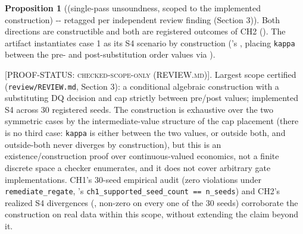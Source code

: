 \documentclass[11pt,a4paper]{article}
\theoremstyle{definition}
\newtheorem{proposition}{Proposition}
\newcommand{\proofstatus}[1]{[\textsc{PROOF-STATUS}: \textsc{#1}]}
\begin{document}
\begin{proposition}[(single-pass unsoundness, scoped to the implemented construction) -{}- retagged per independent review finding (Section 3)]
Both directions are constructible and both are registered outcomes of CH2 (). The artifact instantiates case 1 as its S4 scenario by construction ('s , placing \texttt{kappa} between the pre- and post-substitution order values via ).

\proofstatus{checked-scope-only (REVIEW.md)}. Largest scope certified (\texttt{review/REVIEW.md}, Section 3): a conditional algebraic construction with a substituting DQ decision and cap strictly between pre/post values; implemented S4 across 30 registered seeds. The construction is exhaustive over the two symmetric cases by the intermediate-value structure of the cap placement (there is no third case: \texttt{kappa} is either between the two values, or outside both, and outside-both never diverges by construction), but this is an existence/construction proof over continuous-valued economics, not a finite discrete space a checker enumerates, and it does not cover arbitrary gate implementations. CH1's 30-seed empirical audit (zero violations under \texttt{remediate\_regate}, 's \texttt{ch1\_supported\_seed\_count == n\_seeds}) and CH2's realized S4 divergences (, non-zero on every one of the 30 seeds) corroborate the construction on real data within this scope, without extending the claim beyond it.
\end{proposition}
\end{document}
